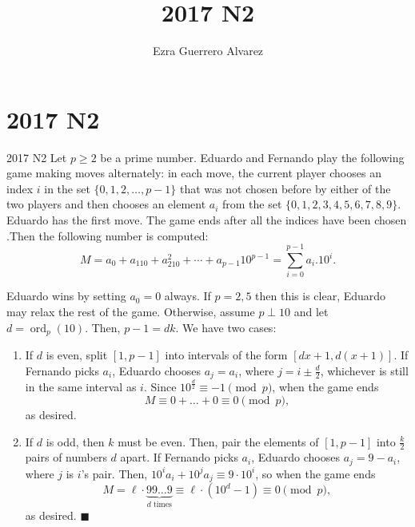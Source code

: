 \documentclass[14pt]{article}
\title{2017 N2}
\author{Ezra Guerrero Alvarez}
\begin{document}
\maketitle
	
\section*{2017 N2}

\begin{statement}{2017 N2}
	Let $ p \geq 2$ be a prime number. Eduardo and Fernando play the following game making moves alternately: in each move, the current player chooses an index $i$ in the set $\{0,1,2,\ldots, p-1 \}$ that was not chosen before by either of the two players and then chooses an element $a_i$ from the set $\{0,1,2,3,4,5,6,7,8,9\}$. Eduardo has the first move. The game ends after all the indices have been chosen .Then the following number is computed:
	\[ M=a_0+a_110+a_210^2+\cdots+a_{p-1}10^{p-1}= \sum_{i=0}^{p-1}a_i.10^i .\]
\end{statement}
Eduardo wins by setting $a_0=0$ always. If $p=2,5$ then this is clear, Eduardo may relax the rest of the game. Otherwise, assume $p\perp 10$ and let $d=\operatorname{ord}_p(10)$. Then, $p-1=dk$. We have two cases:
\begin{enumerate}
	\item If $d$ is even, split $[1,p-1]$ into intervals of the form $[dx+1,d(x+1)]$. If Fernando picks $a_i$, Eduardo chooses $a_j=a_i$, where $j=i\pm\frac d2$, whichever is still in the same interval as $i$. Since $10^{\frac d2}\equiv -1\pmod p$, when the game ends
	\[ M\equiv 0+\ldots+0\equiv 0\pmod p, \]
	as desired.
	\item If $d$ is odd, then $k$ must be even. Then, pair the elements of $[1,p-1]$ into $\frac k2$ pairs of numbers $d$ apart. If Fernando picks $a_i$, Eduardo chooses $a_j=9-a_i$, where $j$ is $i$'s pair. Then, $10^ia_i+10^ja_j\equiv 9\cdot 10^i$, so when the game ends
	\[ M=\ell\cdot\underbrace{99\ldots9}_{d \text{ times}}\equiv\ell\cdot(10^d-1)\equiv 0\pmod p, \]
	as desired. $\blacksquare$
\end{enumerate}
	
\end{document}
